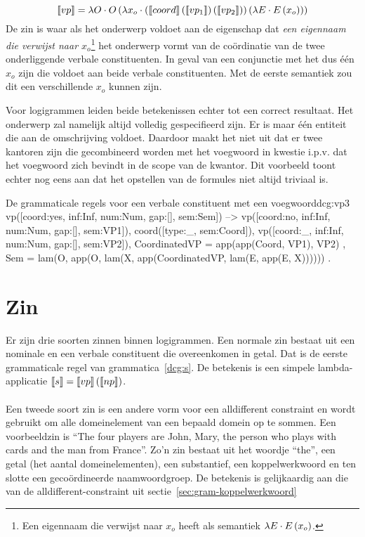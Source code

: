 $$\llbracket vp\rrbracket = \lambda O \cdot O \left( \lambda x_o \cdot \left( \llbracket coord\rrbracket \left( \llbracket vp_1\rrbracket \right) \left( \llbracket vp_2\rrbracket \right) \right) \left( \lambda E \cdot E \left( x_o \right) \right) \right)$$ De zin is waar als het onderwerp voldoet aan de eigenschap dat \textit{een eigennaam die verwijst naar $x_o$}\footnote{Een eigennaam die verwijst naar $x_o$ heeft als semantiek $\lambda E \cdot E \left( x_o \right)$.} het onderwerp vormt van de coördinatie van de twee onderliggende verbale constituenten. In geval van een conjunctie met het dus één $x_o$ zijn die voldoet aan beide verbale constituenten. Met de eerste semantiek zou dit een verschillende $x_o$ kunnen zijn. 

Voor logigrammen leiden beide betekenissen echter tot een correct resultaat. Het onderwerp zal namelijk altijd volledig gespecifieerd zijn. Er is maar één entiteit die aan de omschrijving voldoet. Daardoor maakt het niet uit dat er twee kantoren zijn die gecombineerd worden met het voegwoord in kwestie i.p.v. dat het voegwoord zich bevindt in de scope van de kwantor. Dit voorbeeld toont echter nog eens aan dat het opstellen van de formules niet altijd triviaal is.

\begin{dcg}{De grammaticale regels voor een verbale constituent met een voegwoord}{dcg:vp3}
vp([coord:yes, inf:Inf, num:Num, gap:[], sem:Sem]) -->
  vp([coord:no, inf:Inf, num:Num, gap:[], sem:VP1]),
  coord([type:_, sem:Coord]),
  vp([coord:_, inf:Inf, num:Num, gap:[], sem:VP2]),
  { CoordinatedVP = app(app(Coord, VP1), VP2) },
  { Sem = lam(O, app(O, lam(X, app(CoordinatedVP, lam(E, app(E, X)))))) }.
\end{dcg}

\section{Zin}
Er zijn drie soorten zinnen binnen logigrammen. Een normale zin bestaat uit een nominale en een verbale constituent die overeenkomen in getal. Dat is de eerste grammaticale regel van grammatica~\ref{dcg:s}. De betekenis is een simpele lambda-applicatie $\llbracket s\rrbracket = \llbracket vp\rrbracket \left( \llbracket np\rrbracket \right)$.

\paragraph{} Een tweede soort zin is een andere vorm voor een alldifferent constraint en wordt gebruikt om alle domeinelement van een bepaald domein op te sommen. Een voorbeeldzin is ``The four players are John, Mary, the person who plays with cards and the man from France''. Zo'n zin bestaat uit het woordje ``the'', een getal (het aantal domeinelementen), een substantief, een koppelwerkwoord en ten slotte een gecoördineerde naamwoordgroep. De betekenis is gelijkaardig aan die van de alldifferent-constraint uit sectie~\ref{sec:gram-koppelwerkwoord}

